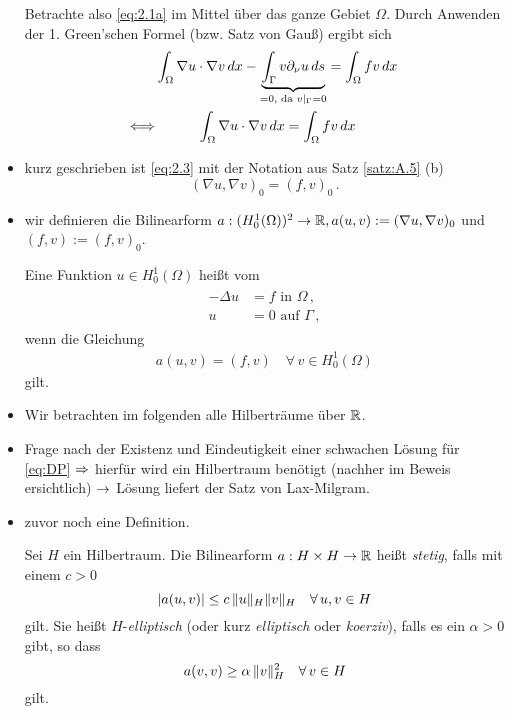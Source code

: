 \begin{itemize}
Betrachte also \eqref{eq:2.1a} im Mittel über das ganze Gebiet $\Omega$. Durch Anwenden der 1. Green'schen Formel (bzw. Satz von Gauß) ergibt sich
\begin{align}
\notag	& \int_\Omega \nabla u \cdot \nabla v \, dx -\underbrace{\int_\Gamma v \partial_\nu u \, ds}_{=0, \text{ da } v|_\Gamma = 0} = \int_\Omega f v \, dx \, \\
\label{eq:2.3}	\Longleftrightarrow & \quad \qquad \int_\Omega \nabla u \cdot \nabla v \, dx =\int_\Omega f v \, dx
\end{align}
\item kurz geschrieben ist \eqref{eq:2.3} mit der Notation aus Satz \ref{satz:A.5} (b) 
\[
	(\nabla u, \nabla v)_0 = (f,v)_0 \, .
\]
\item wir definieren die Bilinearform $a: (H^1_0(\Omega))^2 \rightarrow \mathbb{R}, a(u,v) := (\nabla u, \nabla v)_0$ und $(f,v):=(f,v)_0$.
\begin{defi}
Eine Funktion $u \in H^1_0(\Omega)$ heißt \textit{} vom 
\begin{align}\label{eq:DP}\tag{DP}
\begin{aligned}
	-\Delta  u &=  f \text{ in } \Omega \, ,\\
	 u & = 0 \text{ auf } \Gamma \, ,
\end{aligned}
\end{align}
wenn die Gleichung
\begin{align}\label{eq:2.4}
	a(u,v) = (f,v)\quad \forall \, v \in H^1_0(\Omega) 
\end{align}
gilt.
\end{defi}
\item Wir betrachten im folgenden alle Hilberträume über $\mathbb{R}$.
\item Frage nach der Existenz und Eindeutigkeit einer schwachen Lösung für \eqref{eq:DP} $\Rightarrow$ hierfür wird ein Hilbertraum benötigt (nachher im Beweis ersichtlich) $\rightarrow$ Lösung liefert der Satz von Lax-Milgram.
\item zuvor noch eine Definition.
\begin{defi}
Sei $H$ ein Hilbertraum. Die Bilinearform  $a : H\times H \rightarrow \mathbb{R}$ heißt \textit{stetig}, falls mit einem $c>0$
\[
	\lvert a(u,v)\rvert \le c \, \lVert u\rVert_H   \lVert v\rVert_H \quad \forall \, u,v \in H
\]
gilt. Sie heißt $H$-\textit{elliptisch} (oder kurz \textit{elliptisch} oder \textit{koerziv}), falls es ein $\alpha > 0$ gibt, so dass
\[
	a(v,v) \ge \alpha \, \lVert v\rVert_H^2 \quad \forall \, v \in H 
\]
gilt.
\end{defi}


\end{itemize}
